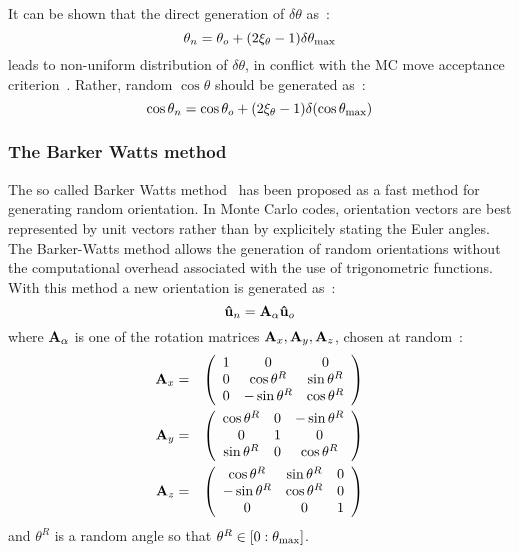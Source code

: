 It can be shown that the direct generation of $\delta\theta$ as~:
\begin{equation*}
	\theta_n = \theta_o + (2\xi_\theta -1)\delta\theta_{\mathrm{max}}	
\end{equation*}
leads to non-uniform distribution of $\delta\theta$, in conflict with the
MC move acceptance criterion~\cite{AandT}. Ra\-ther,
random $\cos\theta$ should be generated as~:
\begin{equation*}
	\cos\theta_n = \cos\theta_o + (2\xi_\theta -1)\delta(\cos\theta_{\mathrm{max}})
\end{equation*}

\subsubsection{The Barker Watts method}

The so called Barker Watts method~\cite{BarkerWatts69} has been proposed as a fast method for
generating random orientation. In Monte Carlo codes, orientation vectors are best represented
by unit vectors rather than by explicitely stating the Euler angles. The Barker-Watts method 
allows the generation of
random orientations without the computational overhead associated with the use of 
trigonometric functions. With this method a new orientation is generated as~:
\begin{equation}
	\mathbf{\hat{u} }_n = \mathbf{A}_{\alpha}\mathbf{\hat{u} }_o
\end{equation}
where $\mathbf{A}_{\alpha}$ is one of the rotation matrices $\mathbf{A}_x,\mathbf{A}_y,\mathbf{A}_z$,
chosen at random~:
\begin{eqnarray}
	\vect{A}_x &=& \lp
	\begin{array}{ccc}
	1		&0		&0		\\
	0		&\cos\theta^R	&\sin\theta^R	\\
	0		&-\sin\theta^R	&\cos\theta^R
	\end{array}
	\rp
	\\
%
	\vect{A}_y &=& \lp
	\begin{array}{ccc}
	\cos\theta^R	&0		&-\sin\theta^R	\\
	0		&1		&0		\\
	\sin\theta^R	&0		&\cos\theta^R
	\end{array}
	\rp	
	\\
%
	\vect{A}_z &=& \lp
	\begin{array}{ccc}
	\cos\theta^R	&\sin\theta^R	&0	\\
	-\sin\theta^R	&\cos\theta^R	&0	\\
	0		&0		&1
	\end{array}
	\rp
\end{eqnarray}
and $\theta^R$ is a random angle so that $\theta^R \in [0:\theta_{\mathrm{max}}]$.

